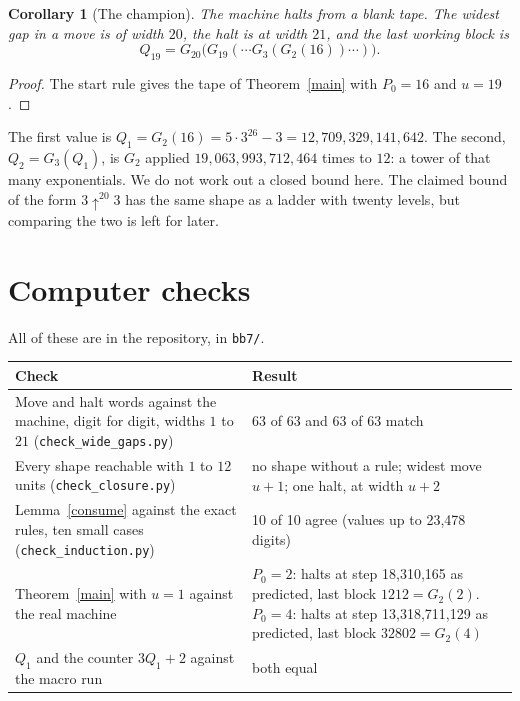 \documentclass[11pt]{article}
\newtheorem{corollary}{Corollary}
\theoremstyle{definition}
\theoremstyle{remark}
\begin{document}
\begin{corollary}[The champion]\label{champ}
The machine halts from a blank tape. The widest gap in a move is of width $20$,
the halt is at width $21$, and the last working block is
\[
Q_{19}=G_{20}\bigl(G_{19}(\cdots G_3(G_2(16))\cdots)\bigr).
\]
\end{corollary}
\begin{proof}
The start rule gives the tape of Theorem~\ref{main} with $P_0=16$ and $u=19$.
\end{proof}

The first value is $Q_1=G_2(16)=5\cdot 3^{26}-3=12{,}709{,}329{,}141{,}642$.
The second, $Q_2=G_3(Q_1)$, is $G_2$ applied
$19{,}063{,}993{,}712{,}464$ times to $12$: a tower of that many
exponentials. We do not work out a closed bound here. The claimed bound of the
form $3\uparrow^{20}3$ has the same shape as a ladder with twenty levels, but
comparing the two is left for later.

\section{Computer checks}

All of these are in the repository, in \texttt{bb7/}.

\begin{center}
\begin{tabular}{@{}p{}p{}@{}}
\toprule
Check & Result \\
\midrule
Move and halt words against the machine, digit for digit, widths $1$ to $21$
(\texttt{check\_wide\_gaps.py}) & 63 of 63 and 63 of 63 match \\
Every shape reachable with $1$ to $12$ units (\texttt{check\_closure.py}) &
no shape without a rule; widest move $u+1$; one halt, at width $u+2$ \\
Lemma~\ref{consume} against the exact rules, ten small cases
(\texttt{check\_induction.py}) & 10 of 10 agree (values up to 23{,}478 digits) \\
Theorem~\ref{main} with $u=1$ against the real machine & $P_0=2$: halts at step
18{,}310{,}165 as predicted, last block $1212=G_2(2)$.\quad $P_0=4$: halts at step
13{,}318{,}711{,}129 as predicted, last block $32802=G_2(4)$ \\
$Q_1$ and the counter $3Q_1+2$ against the macro run & both equal \\
\bottomrule
\end{tabular}
\end{center}
\end{document}
